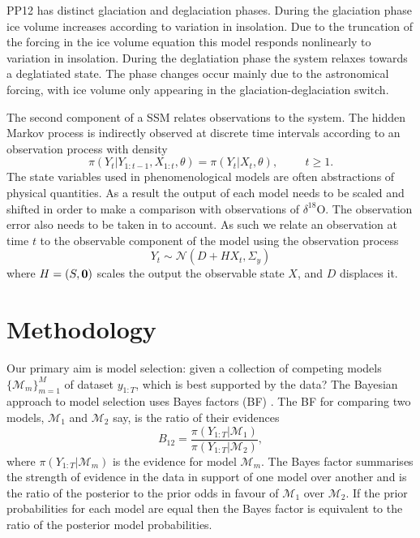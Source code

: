\documentclass[a4paper,12pt]{article}
\begin{document}
PP12 \cite{Parrenin2012} has distinct glaciation and deglaciation phases.
During the glaciation phase ice volume increases according to variation in insolation.
Due to the truncation of the forcing in the ice volume equation this model responds nonlinearly to variation in insolation.
During the deglatiation phase the system relaxes towards a deglatiated state.
The phase changes occur mainly due to the astronomical forcing, with ice volume only appearing in the glaciation-deglaciation switch.

The second component of a SSM relates observations to the system.
The hidden Markov process is indirectly observed at discrete time intervals according to an observation process with density 
\begin{equation}
\pi (Y_t \vert Y_{1:t-1}, X_{1:t}, \theta) = \pi (Y_t \vert X_t, \theta), \hspace{1cm} t \geq 1 .
\end{equation}
\noindent The state variables used in phenomenological models are often abstractions of physical quantities.
As a result the output of each model needs to be scaled and shifted in order to make a comparison with observations of $\delta^{18}$O.
The observation error also needs to be taken in to account.
As such we relate an observation at time $t$ to the observable component of the model using the observation process
\[ Y_t \sim \mathcal{N} ( D + H X_t, \Sigma_y) \]
\noindent where $H=(S,{\bf 0})$ scales the output the observable state $X$, and $D$ displaces it.


%
%
%
%
%

\clearpage
\color{black}
\section{Methodology}
\label{Sec:Meth}

Our primary aim is model selection: given a collection of competing models $\{\mathcal{M}_m\}_{m=1}^M$ of dataset $y_{1:T}$, which is best supported by the data? 
The Bayesian approach to model selection uses Bayes factors (BF) \cite{Jeffreys1939, Kass1995}. The BF for comparing two models, $\mathcal{M}_1$ and $\mathcal{M}_2$ say, is the ratio of their evidences
\begin{equation} \label{Eqn:BF}
B_{12} = \frac{\pi(Y_{1:T} \vert \mathcal{M}_1)}{\pi(Y_{1:T} \vert \mathcal{M}_2)},
\end{equation}
\noindent where $\pi(Y_{1:T} \vert \mathcal{M}_m)$ is the evidence  for model $\mathcal{M}_m$.
The Bayes factor summarises the strength of evidence in the data in support of one model over another and is the ratio of the posterior to the prior odds in favour of $\mathcal{M}_1$ over $\mathcal{M}_2$.
If the prior probabilities for each model are equal then the Bayes factor is equivalent to the ratio of the posterior model probabilities.
\end{document}
